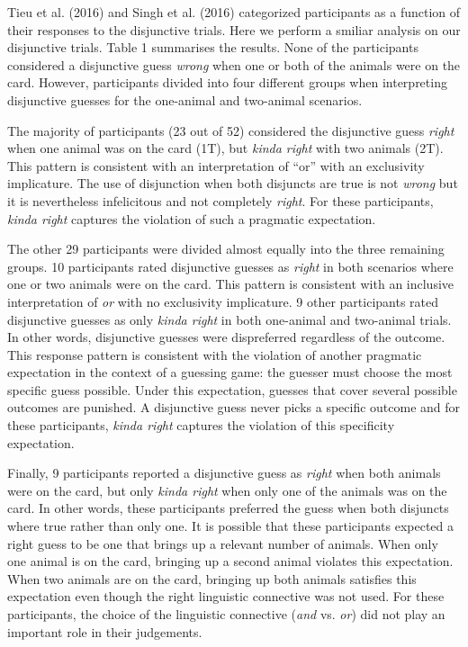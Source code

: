 \documentclass[10pt, letterpaper]{article}
\begin{document}
Tieu et al. (2016) and Singh et al. (2016) categorized participants as a
function of their responses to the disjunctive trials. Here we perform a
smiliar analysis on our disjunctive trials. Table 1 summarises the
results. None of the participants considered a disjunctive guess
\emph{wrong} when one or both of the animals were on the card. However,
participants divided into four different groups when interpreting
disjunctive guesses for the one-animal and two-animal scenarios.

The majority of participants (23 out of 52) considered the disjunctive
guess \emph{right} when one animal was on the card (1T), but \emph{kinda
right} with two animals (2T). This pattern is consistent with an
interpretation of ``or'' with an exclusivity implicature. The use of
disjunction when both disjuncts are true is not \emph{wrong} but it is
nevertheless infelicitous and not completely \emph{right}. For these
participants, \emph{kinda right} captures the violation of such a
pragmatic expectation.

The other 29 participants were divided almost equally into the three
remaining groups. 10 participants rated disjunctive guesses as
\emph{right} in both scenarios where one or two animals were on the
card. This pattern is consistent with an inclusive interpretation of
\emph{or} with no exclusivity implicature. 9 other participants rated
disjunctive guesses as only \emph{kinda right} in both one-animal and
two-animal trials. In other words, disjunctive guesses were dispreferred
regardless of the outcome. This response pattern is consistent with the
violation of another pragmatic expectation in the context of a guessing
game: the guesser must choose the most specific guess possible. Under
this expectation, guesses that cover several possible outcomes are
punished. A disjunctive guess never picks a specific outcome and for
these participants, \emph{kinda right} captures the violation of this
specificity expectation.

Finally, 9 participants reported a disjunctive guess as \emph{right}
when both animals were on the card, but only \emph{kinda right} when
only one of the animals was on the card. In other words, these
participants preferred the guess when both disjuncts where true rather
than only one. It is possible that these participants expected a right
guess to be one that brings up a relevant number of animals. When only
one animal is on the card, bringing up a second animal violates this
expectation. When two animals are on the card, bringing up both animals
satisfies this expectation even though the right linguistic connective
was not used. For these participants, the choice of the linguistic
connective (\emph{and} vs. \emph{or}) did not play an important role in
their judgements.
\end{document}
